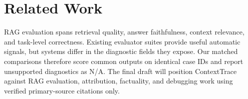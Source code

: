 \section{Related Work}
RAG evaluation spans retrieval quality, answer faithfulness, context relevance,
and task-level correctness. Existing evaluator suites provide useful automatic
signals, but systems differ in the diagnostic fields they expose. Our matched
comparisons therefore score common outputs on identical case IDs and report
unsupported diagnostics as N/A. The final draft will position ContextTrace
against RAG evaluation, attribution, factuality, and debugging work using
verified primary-source citations only.
